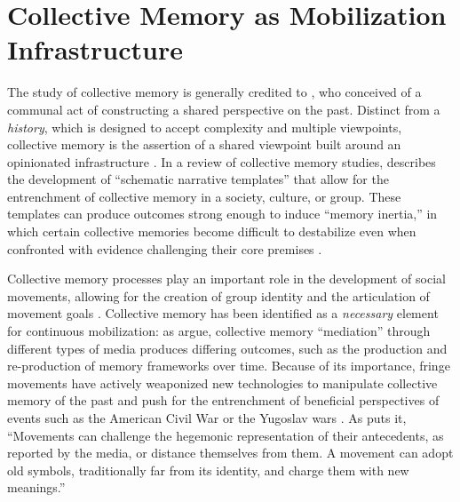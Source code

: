 \documentclass[bibtex,autowc,nonblind]{apsr_submission}
\begin{document}
\section{Collective Memory as Mobilization Infrastructure}

The study of collective memory is generally credited to \citet{halbwachs1992collective}, who conceived of a communal act of constructing a shared perspective on the past. Distinct from a \textit{history}, which is designed to accept complexity and multiple viewpoints, collective memory is the assertion of a shared viewpoint built around an opinionated infrastructure \citep{assmann1995collective, olick1999collective}. In a review of collective memory studies, \citet{wertsch2018collective} describes the development of ``schematic narrative templates'' that allow for the entrenchment of collective memory in a society, culture, or group. These templates can produce outcomes strong enough to induce ``memory inertia,'' in which certain collective memories become difficult to destabilize even when confronted with evidence challenging their core premises \citep{schuman2005elite}.

Collective memory processes play an important role in the development of social movements, allowing for the creation of group identity and the articulation of movement goals \citep{zamponi2013collective, kuo2024political}. Collective memory has been identified as a \textit{necessary} element for continuous mobilization: as \citet{lundstrom2022temporal} argue, collective memory ``mediation'' through different types of media produces differing outcomes, such as the production and re-production of memory frameworks over time. Because of its importance, fringe movements have actively weaponized new technologies to manipulate collective memory of the past and push for the entrenchment of beneficial perspectives of events such as the American Civil War or the Yugoslav wars \citep{wasilewski2023radical, ristic2024far}. As \citet{zamponi2013collective} puts it, ``Movements can challenge the hegemonic representation of their antecedents, as reported by the media, or distance themselves from them. A movement can adopt old symbols, traditionally far from its identity, and charge them with new meanings.''
\end{document}
